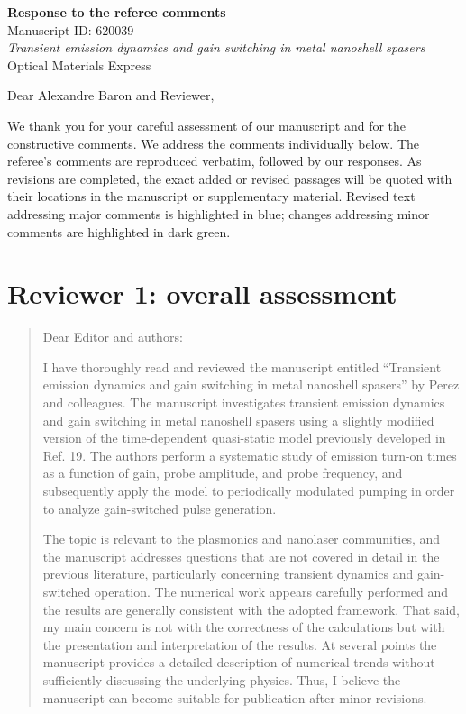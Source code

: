 \documentclass[11pt,a4paper]{article}
\newcommand{\reviewercomment}[1]{\begin{quote}\small #1\end{quote}}
\begin{document}
\begin{center}
{\Large\bfseries Response to the referee comments}\\[0.6em]
Manuscript ID: 620039\\
\textit{Transient emission dynamics and gain switching in metal nanoshell spasers}\\
Optical Materials Express
\end{center}

Dear Alexandre Baron and Reviewer,

We thank you for your careful assessment of our manuscript and for the constructive comments. We address the comments individually below. The referee's comments are reproduced verbatim, followed by our responses. As revisions are completed, the exact added or revised passages will be quoted with their locations in the manuscript or supplementary material. Revised text addressing major comments is highlighted in blue; changes addressing minor comments are highlighted in dark green.

\section*{Reviewer 1: overall assessment}
\reviewercomment{
Dear Editor and authors:

I have thoroughly read and reviewed the manuscript entitled “Transient emission dynamics and gain switching in metal nanoshell spasers” by Perez and colleagues. The manuscript investigates transient emission dynamics and gain switching in metal nanoshell spasers using a slightly modified version of the time-dependent quasi-static model previously developed in Ref. 19. The authors perform a systematic study of emission turn-on times as a function of gain, probe amplitude, and probe frequency, and subsequently apply the model to periodically modulated pumping in order to analyze gain-switched pulse generation.

The topic is relevant to the plasmonics and nanolaser communities, and the manuscript addresses questions that are not covered in detail in the previous literature, particularly concerning transient dynamics and gain-switched operation. The numerical work appears carefully performed and the results are generally consistent with the adopted framework. That said, my main concern is not with the correctness of the calculations but with the presentation and interpretation of the results. At several points the manuscript provides a detailed description of numerical trends without sufficiently discussing the underlying physics. Thus, I believe the manuscript can become suitable for publication after minor revisions.
}
\end{document}
